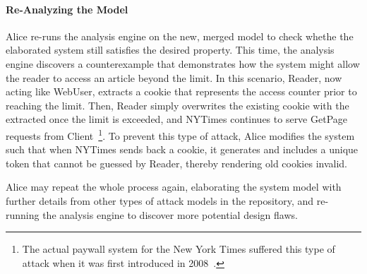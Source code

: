 \paragraph{\textbf{Re-Analyzing the Model}}

Alice re-runs the analysis engine on the new, merged model to check
whethe the elaborated system still satisfies the desired
property. This time, the analysis engine discovers a counterexample
that demonstrates how the system might allow the reader to access an
article beyond the limit. In this scenario, \textsf{Reader}, now
acting like \textsf{WebUser}, extracts a
cookie that represents the access counter prior to reaching the
limit. Then, \textsf{Reader} simply overwrites the existing cookie
with the extracted once the limit is exceeded, and \textsf{NYTimes}
continues to serve \textsf{GetPage} requests from
\textsf{Client}~\footnote{The actual paywall system for the New York
  Times suffered this type of attack when it was first introduced in
  2008~\cite{nytimes-attack}.}. To prevent this type of attack, Alice
modifies the system such that when \textsf{NYTimes} sends back a
cookie, it generates and includes a unique token that cannot be
guessed by \textsf{Reader}, thereby rendering old cookies invalid.



Alice may repeat the whole process again, elaborating the system model
with further details from other types of attack models in the
repository, and re-running the analysis engine to discover more
potential design flaws.

